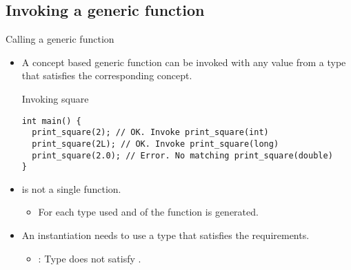 \subsection{Invoking a generic function} 

\begin{frame}[t,fragile]{Calling a generic function}
\begin{itemize}
  \item A concept based generic function can be invoked with any value from
        a type that satisfies the corresponding concept.
\begin{block}{Invoking square}
\begin{lstlisting}
int main() {
  print_square(2); // OK. Invoke print_square(int)
  print_square(2L); // OK. Invoke print_square(long)
  print_square(2.0); // Error. No matching print_square(double)
}
\end{lstlisting}
\end{block}

  \item {} is not a single function.
    \begin{itemize}
      \item For each type used and  of the function is generated.
    \end{itemize}

  \item An instantiation needs to use a type that satisfies the requirements.
    \begin{itemize}
      \item {}: Type  does not satisfy .
    \end{itemize}
\end{itemize}

\end{frame}
